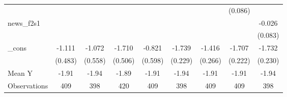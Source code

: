 {\begin{tabular}{l*{8}{c}}
            &                     &                     &                     &                     &                     &                     &     (0.086)         &                     \\
\addlinespace
news\_f2s1   &                     &                     &                     &                     &                     &                     &                     &      -0.026         \\
            &                     &                     &                     &                     &                     &                     &                     &     (0.083)         \\
\addlinespace
\_cons      &      -1.111\sym{**} &      -1.072\sym{*}  &      -1.710\sym{***}&      -0.821         &      -1.739\sym{***}&      -1.416\sym{***}&      -1.707\sym{***}&      -1.732\sym{***}\\
            &     (0.483)         &     (0.558)         &     (0.506)         &     (0.598)         &     (0.229)         &     (0.266)         &     (0.222)         &     (0.230)         \\
\midrule
Mean Y      &       -1.91         &       -1.94         &       -1.89         &       -1.91         &       -1.94         &       -1.91         &       -1.91         &       -1.94         \\
Observations&         409         &         398         &         420         &         409         &         398         &         409         &         409         &         398         \\
\bottomrule
\end{tabular}
}
